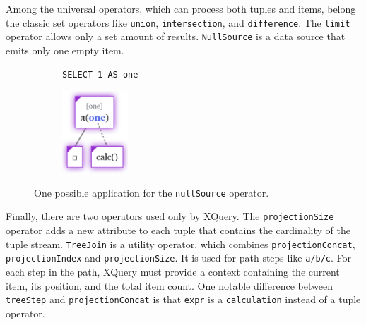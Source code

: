 Among the universal operators, which can process both tuples and items, belong the classic set operators like \texttt{union}, \texttt{intersection}, and \texttt{difference}. The \texttt{limit} operator allows only a set amount of results. \texttt{NullSource} is a data source that emits only one empty item.

\begin{figure}[htpb]
    \begin{subfigure}[b]{\textwidth}
    \begin{tcolorbox}[colback=white, colframe=black, boxrule=1pt, arc=0pt]
        \begin{verbatim}
SELECT 1 AS one
        \end{verbatim}
    \end{tcolorbox}
    \end{subfigure}
    
    \medskip
    
    \begin{subfigure}[b]{\textwidth}
        \centering
        \includegraphics[width=70pt]{img/tree-null-source.png}
    \end{subfigure}
    
    \caption{One possible application for the \texttt{nullSource} operator.}
\end{figure}

Finally, there are two operators used only by XQuery. The \texttt{projectionSize} operator adds a new attribute to each tuple that contains the cardinality of the tuple stream. \texttt{TreeJoin} is a utility operator, which combines \texttt{projectionConcat}, \texttt{projectionIndex} and \texttt{projectionSize}. It is used for path steps like \texttt{a/b/c}. For each step in the path, XQuery must provide a context containing the current item, its position, and the total item count. One notable difference between \texttt{treeStep} and \texttt{projectionConcat} is that \texttt{expr} is a \texttt{calculation} instead of a tuple operator.

